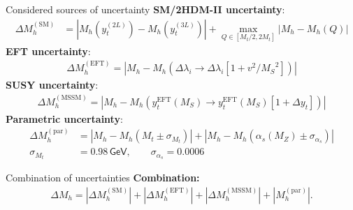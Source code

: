 \documentclass[hyperref={pdfpagelabels=false},ngerman]{beamer}
\newcommand{\eh}[1]{\,\mathsf{#1}}
\newcommand{\MS}{\ensuremath{M_S}}
\renewcommand{\emph}{\textbf}
\newcommand{\SM}{\ensuremath{\text{SM}}}
\newcommand{\MSSM}{\ensuremath{\text{MSSM}}}
\newcommand{\EFT}{\ensuremath{\text{EFT}}\xspace}
\begin{document}
\begin{frame}{Considered sources of uncertainty}
\emph{SM/2HDM-II uncertainty}:
  \begin{align*}
    \Delta M_h^{(\SM)} &=
    \left| M_h(y_t^{(2L)}) - M_h(y_t^{(3L)}) \right|
                         + \max_{Q\in[M_t/2, 2M_t]}\left| M_h - M_h(Q) \right|
  \end{align*}
\emph{EFT uncertainty}:
  \begin{align*}
    \Delta M_h^{(\EFT)} = \left| M_h - M_h(\Delta\lambda_i \rightarrow \Delta\lambda_i [1 +
    v^2/\MS^2]) \right|
  \end{align*}
\emph{SUSY uncertainty}:
  \begin{align*}
    \Delta M_h^{(\MSSM)} = \left| M_h - M_h(y_t^{\EFT}(\MS) \rightarrow y_t^{\EFT}(\MS) [1 +
    \Delta y_t]) \right|
  \end{align*}
\emph{Parametric uncertainty}:
  \begin{align*}
    \Delta M_h^{(\text{par})} &= |M_h - M_h(M_t \pm \sigma_{M_t})|
                                + \left|M_h - M_h(\alpha_s(M_Z) \pm \sigma_{\alpha_s})\right|\\
    \sigma_{M_t} &= 0.98\eh{GeV}, \qquad
    \sigma_{\alpha_s} = 0.0006
  \end{align*}
\end{frame}

\begin{frame}{Combination of uncertainties}
  \emph{Combination:}
  \begin{align*}
    \Delta M_h = | \Delta M_h^{(\SM)} | + | \Delta M_h^{(\EFT)} |
    + | \Delta M_h^{(\MSSM)} | + | M_h^{(\text{par})} | .  
  \end{align*}
\end{frame}

\begin{frame}{Individual uncertainties in scenario IV (2HDM-II)}
  \texttt{[image: \{\{plots/THDM/THDMIIMSSMBCFull\_uncertainty\_MS\_MA-800\_uncertainty\_advanced]}}}
\end{frame}
\end{document}
